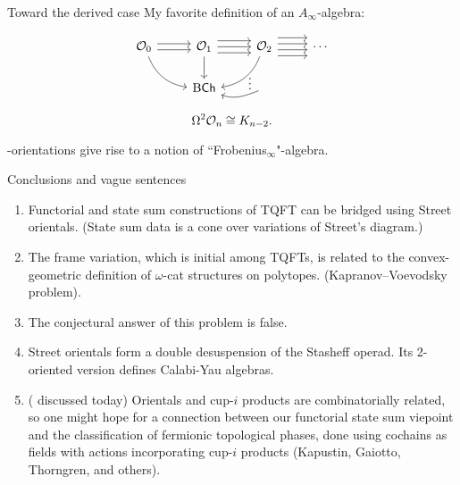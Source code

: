 \begin{frame}[fragile]{Toward the derived case}
	\pause
	My favorite definition of an $A_\infty$-algebra:

	\pause
	\[
	\begin{tikzcd}
		\cO_0 \arrow[dr, bend right] \arrow[r,shift left=1] \arrow[r,shift right=1] &
		\cO_1 \dar \arrow[r,shift left=2] \arrow[r,shift right=2] \rar &
		\cO_2 \arrow[dl, bend left] \arrow[r,shift left=1] \arrow[r,shift right=1] \arrow[r,shift left=3] \arrow[r,shift right=3] & \cdots \\
		& \rB\Ch & \arrow[l,"\vdots"',pos=0.1, in=-20, out=200] &
	\end{tikzcd}
	\]

	\pause\bigskip
	\[
	\Omega^2 \mathcal{O}_n \cong K_{n-2}.
	\]

	\pause{}-orientations give rise to a notion of ``Frobenius$_\infty$"-algebra.

\end{frame}

\begin{frame}{Conclusions and vague sentences}
	\begin{enumerate}
		\pause\item Functorial and state sum constructions of TQFT can be bridged using Street orientals. (State sum data is a cone over variations of Street's diagram.)
		\pause\item The frame variation, which is initial among TQFTs, is related to the convex-geometric definition of $\omega$-cat structures on polytopes.
		(Kapranov--Voevodsky problem).
		\pause\item The conjectural answer of this problem is false.
		\pause\item Street orientals form a double desuspension of the Stasheff operad.
		Its 2-oriented version defines Calabi-Yau algebras.
		\pause\item ( discussed today) Orientals and cup-$i$ products are combinatorially related, so one might hope for a connection between our functorial state sum viepoint and the classification of fermionic topological phases, done using cochains as fields with actions incorporating cup-$i$ products (Kapustin, Gaiotto, Thorngren, and others).
	\end{enumerate}
\end{frame}